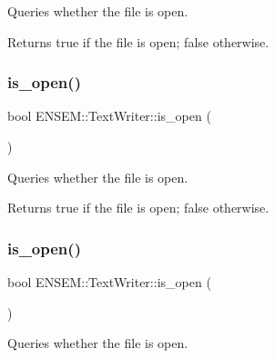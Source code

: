 Queries whether the file is open. 

\begin{DoxyReturn}{Returns}
true if the file is open; false otherwise. 
\end{DoxyReturn}
\mbox{\label{classENSEM_1_1TextWriter_a6718d81018fe6a709f11cdb2f008c68b}} 
\subsubsection{\texorpdfstring{is\_open()}{is\_open()}\hspace{0.1cm}{\footnotesize\ttfamily [2/3]}}
{\footnotesize\ttfamily bool E\+N\+S\+E\+M\+::\+Text\+Writer\+::is\+\_\+open (\begin{DoxyParamCaption}{ }\end{DoxyParamCaption})}



Queries whether the file is open. 

\begin{DoxyReturn}{Returns}
true if the file is open; false otherwise. 
\end{DoxyReturn}
\mbox{\label{classENSEM_1_1TextWriter_a6718d81018fe6a709f11cdb2f008c68b}} 
\subsubsection{\texorpdfstring{is\_open()}{is\_open()}\hspace{0.1cm}{\footnotesize\ttfamily [3/3]}}
{\footnotesize\ttfamily bool E\+N\+S\+E\+M\+::\+Text\+Writer\+::is\+\_\+open (\begin{DoxyParamCaption}{ }\end{DoxyParamCaption})}



Queries whether the file is open. 

